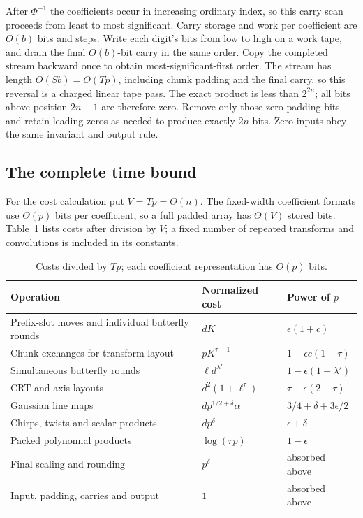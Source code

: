 \documentclass[11pt]{article}
\theoremstyle{definition}
\begin{document}
After $\Phi^{-1}$ the coefficients occur in increasing ordinary index,
so this carry scan proceeds from least to most significant.  Carry
storage and work per coefficient are $O(b)$ bits and steps.  Write
each digit's bits from low to high on a work tape, and drain the final
$O(b)$-bit carry in the same order.  Copy the completed stream backward
once to obtain most-significant-first order.  The stream has length
$O(Sb)=O(Tp)$, including chunk padding and the final carry, so this
reversal is a charged linear tape pass.  The exact product is less
than $2^{2n}$; all bits above position $2n-1$ are therefore zero.
Remove only those zero padding bits and retain leading zeros as needed
to produce exactly $2n$ bits.  Zero inputs obey the same invariant and
output rule.

\subsection{The complete time bound}

For the cost calculation put $V=Tp=\Theta(n)$. The fixed-width coefficient
formats use $\Theta(p)$ bits per coefficient, so a full padded array has
$\Theta(V)$ stored bits. Table~\ref{tab:costs} lists costs after division
by $V$; a fixed number of repeated transforms and convolutions is
included in its constants.
\begin{table}[ht]
\centering
\small
\begin{tabular}{@{}>{\raggedright\arraybackslash}p{.40\linewidth}ll@{}}
\toprule
Operation & Normalized cost & Power of $p$\\
\midrule
Prefix-slot moves and individual butterfly rounds & $dK$ & $\epsilon(1+c)$\\
Chunk exchanges for transform layout & $pK^{\tau-1}$ & $1-\epsilon c(1-\tau)$\\
Simultaneous butterfly rounds & $\ell d^{\lambda'}$ & $1-\epsilon(1-\lambda')$\\
CRT and axis layouts & $d^2(1+\ell^\tau)$ & $\tau+\epsilon(2-\tau)$\\
Gaussian line maps & $dp^{1/2+\delta}\alpha$ & $3/4+\delta+3\epsilon/2$\\
Chirps, twists and scalar products & $dp^\delta$ & $\epsilon+\delta$\\
Packed polynomial products & $\log(rp)$ & $1-\epsilon$\\
Final scaling and rounding & $p^\delta$ & absorbed above\\
Input, padding, carries and output & $1$ & absorbed above\\
\bottomrule
\end{tabular}
\caption{Costs divided by $Tp$; each coefficient
representation has $O(p)$ bits.}\label{tab:costs}
\end{table}
\end{document}
